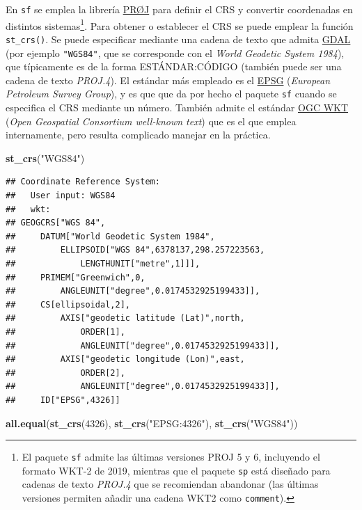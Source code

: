 \documentclass[
]{book}
\newenvironment{Shaded}{\begin{snugshade}}{\end{snugshade}}
\newcommand{\DecValTok}[1]{\textcolor[rgb]{0.00,0.00,0.81}{#1}}
\newcommand{\FunctionTok}[1]{\textcolor[rgb]{0.13,0.29,0.53}{\textbf{#1}}}
\newcommand{\NormalTok}[1]{#1}
\newcommand{\StringTok}[1]{\textcolor[rgb]{0.31,0.60,0.02}{#1}}
\theoremstyle{break}
\theoremstyle{definition}
\theoremstyle{definition}
\theoremstyle{definition}
\theoremstyle{definition}
\theoremstyle{remark}
\begin{document}
En \texttt{sf} se emplea la librería \href{http://proj.org/}{PRØJ} para definir el CRS y convertir coordenadas en distintos sistemas\footnote{El paquete \texttt{sf} admite las últimas versiones PROJ 5 y 6, incluyendo el formato WKT-2 de 2019, mientras que el paquete \texttt{sp} está diseñado para cadenas de texto \emph{PROJ.4} que se recomiendan abandonar (las últimas versiones permiten añadir una cadena WKT2 como \texttt{comment}).}.
Para obtener o establecer el CRS se puede emplear la función \texttt{st\_crs()}.
Se puede especificar mediante una cadena de texto que admita \href{https://gdal.org/tutorials/osr_api_tut.html}{GDAL} (por ejemplo \texttt{"WGS84"}, que se corresponde con el \emph{World Geodetic System 1984}), que típicamente es de la forma ESTÁNDAR:CÓDIGO (también puede ser una cadena de texto \emph{PROJ.4}).
El estándar más empleado es el \href{https://epsg.org}{EPSG} (\emph{European Petroleum Survey Group}), y es que que da por hecho el paquete \texttt{sf} cuando se especifica el CRS mediante un número.
También admite el estándar \href{http://www.opengeospatial.org/standards/wkt-crs}{OGC WKT} (\emph{Open Geospatial Consortium well-known text}) que es el que emplea internamente, pero resulta complicado manejar en la práctica.

\begin{Shaded}
\begin{Highlighting}[]
\FunctionTok{st\_crs}\NormalTok{(}\StringTok{"WGS84"}\NormalTok{)}
\end{Highlighting}
\end{Shaded}

\begin{verbatim}
## Coordinate Reference System:
##   User input: WGS84 
##   wkt:
## GEOGCRS["WGS 84",
##     DATUM["World Geodetic System 1984",
##         ELLIPSOID["WGS 84",6378137,298.257223563,
##             LENGTHUNIT["metre",1]]],
##     PRIMEM["Greenwich",0,
##         ANGLEUNIT["degree",0.0174532925199433]],
##     CS[ellipsoidal,2],
##         AXIS["geodetic latitude (Lat)",north,
##             ORDER[1],
##             ANGLEUNIT["degree",0.0174532925199433]],
##         AXIS["geodetic longitude (Lon)",east,
##             ORDER[2],
##             ANGLEUNIT["degree",0.0174532925199433]],
##     ID["EPSG",4326]]
\end{verbatim}

\begin{Shaded}
\begin{Highlighting}[]
\FunctionTok{all.equal}\NormalTok{(}\FunctionTok{st\_crs}\NormalTok{(}\DecValTok{4326}\NormalTok{), }\FunctionTok{st\_crs}\NormalTok{(}\StringTok{"EPSG:4326"}\NormalTok{), }\FunctionTok{st\_crs}\NormalTok{(}\StringTok{"WGS84"}\NormalTok{))}
\end{Highlighting}
\end{Shaded}
\end{document}
